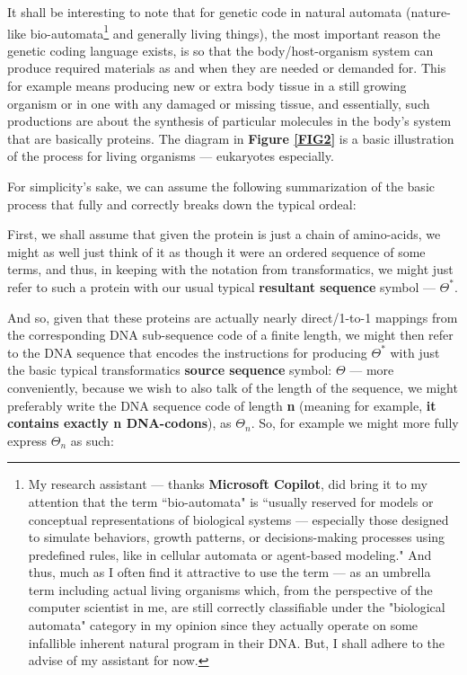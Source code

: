 \documentclass[a4paper, 18pt]{book} %
\begin{document}
It shall be interesting to note that for genetic code in natural automata (nature-like bio-automata\footnote{My research assistant --- thanks \textbf{Microsoft Copilot}, did bring it to my attention that the term ``bio-automata" is ``usually reserved for models or conceptual representations of biological systems --- especially those designed to simulate behaviors, growth patterns, or decisions-making processes using predefined rules, like in cellular automata or agent-based modeling." And thus, much as I often find it attractive to use the term --- as an umbrella term including actual living organisms which, from the perspective of the computer scientist in me, are still correctly classifiable under the "biological automata" category in my opinion since they actually operate on some infallible inherent natural program in their DNA. But, I shall adhere to the advise of my assistant for now.} and generally living things), the most important reason the genetic coding language exists, is so that the body/host-organism system can produce required materials as and when they are needed or demanded for. This for example means producing new or extra body tissue in a still growing organism or in one with any damaged or missing tissue, and essentially, such productions are about the synthesis of particular molecules in the body's system that are basically proteins. The diagram in \textbf{Figure \ref{FIG2}} is a basic illustration of the process for living organisms --- eukaryotes especially.

For simplicity's sake, we can assume the following summarization of the basic process that fully and correctly breaks down the typical ordeal:

First, we shall assume that given the protein is just a chain of amino-acids, we might as well just think of it as though it were an ordered sequence of some terms, and thus, in keeping with the notation from transformatics, we might just refer to such a protein with our usual typical \textbf{resultant sequence} symbol --- $\Theta^*$.

And so, given that these proteins are actually nearly direct/1-to-1 mappings from the corresponding DNA sub-sequence code of a finite length, we might then refer to the DNA sequence that encodes the instructions for producing $\Theta^*$ with just the basic typical transformatics \textbf{source sequence} symbol: $\Theta$ --- more conveniently, because we wish to also talk of the length of the sequence, we might preferably write the DNA sequence code of length \textbf{n} (meaning for example, \textbf{it contains exactly n DNA-codons}), as $\Theta_n$. So, for example we might more fully express $\Theta_n$ as such:
\end{document}
